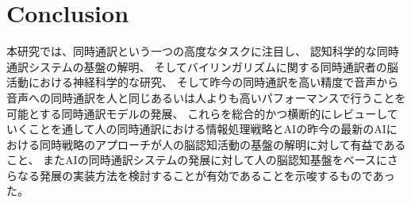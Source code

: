\section{Conclusion}

本研究では、同時通訳という一つの高度なタスクに注目し、
認知科学的な同時通訳システムの基盤の解明、
そしてバイリンガリズムに関する同時通訳者の脳活動における神経科学的な研究、
そして昨今の同時通訳を高い精度で音声から音声への同時通訳を人と同じあるいは人よりも高いパフォーマンスで行うことを可能とする同時通訳モデルの発展、
これらを総合的かつ横断的にレビューしていくことを通して人の同時通訳における情報処理戦略とAIの昨今の最新のAIにおける同時戦略のアプローチが人の脳認知活動の基盤の解明に対して有益であること、
またAIの同時通訳システムの発展に対して人の脳認知基盤をベースにさらなる発展の実装方法を検討することが有効であることを示唆するものであった。

